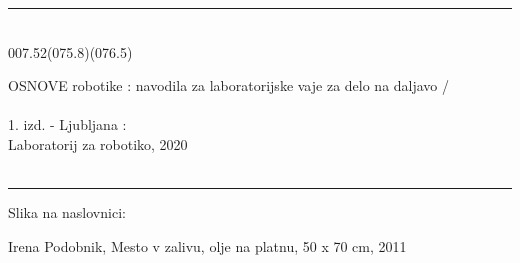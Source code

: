 \documentclass{kapmono}
\theoremstyle{definition}
\theoremstyle{plain}
\begin{document}


\thispagestyle{empty}
\parindent0cm
\normalsize {
\rule{12cm}{0.5pt} \\ %
%

\vskip13pt %
007.52(075.8)(076.5)

\hskip0.7cm   OSNOVE robotike : navodila za laboratorijske vaje za delo na daljavo /\\
\\ 1. izd. - Ljubljana : \\
Laboratorij za robotiko, 2020   %
\\ \\



\vskip5pt %
\rule{12cm}{0.5pt}
\vskip10pt %
Slika na naslovnici:

\hskip0.7cm Irena Podobnik, Mesto v zalivu, olje na platnu, 50 x 70
cm, 2011

\vskip0.5in

%
%

\vskip0.5in




\vskip10pt


}
\end{document}
